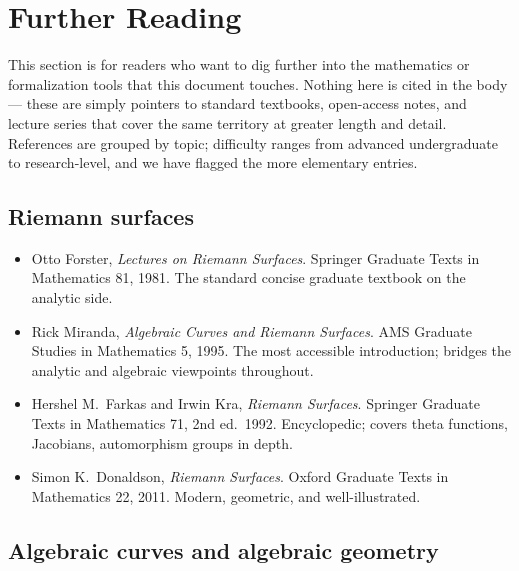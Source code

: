 \section*{Further Reading}
\label{sec:further-reading}

\begin{layman}
This section is for readers who want to dig further into the
mathematics or formalization tools that this document touches.
Nothing here is cited in the body --- these are simply pointers to
standard textbooks, open-access notes, and lecture series that cover
the same territory at greater length and detail. References are
grouped by topic; difficulty ranges from advanced undergraduate to
research-level, and we have flagged the more elementary entries.
\end{layman}

\subsection*{Riemann surfaces}

\begin{itemize}
  \item Otto Forster, \emph{Lectures on Riemann Surfaces}. Springer
    Graduate Texts in Mathematics 81, 1981. The standard concise
    graduate textbook on the analytic side.
  \item Rick Miranda, \emph{Algebraic Curves and Riemann Surfaces}.
    AMS Graduate Studies in Mathematics 5, 1995. The most
    accessible introduction; bridges the analytic and algebraic
    viewpoints throughout.
  \item Hershel M.\ Farkas and Irwin Kra, \emph{Riemann Surfaces}.
    Springer Graduate Texts in Mathematics 71, 2nd ed.\ 1992.
    Encyclopedic; covers theta functions, Jacobians, automorphism
    groups in depth.
  \item Simon K.\ Donaldson, \emph{Riemann Surfaces}. Oxford
    Graduate Texts in Mathematics 22, 2011. Modern, geometric, and
    well-illustrated.
\end{itemize}

\subsection*{Algebraic curves and algebraic geometry}

